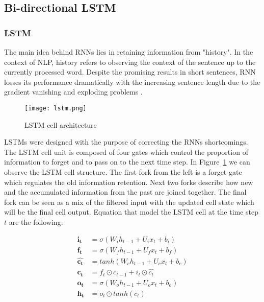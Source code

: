 \subsection{Bi-directional LSTM}

\subsubsection{LSTM}
The main idea behind RNNs lies in retaining information from "history".
In the context of NLP, history refers to observing the context of the
sentence up to the currently processed word. Despite the promising results in short
sentences, RNN losses its performance dramatically with the increasing sentence
length due to the gradient vanishing \cite{bengio1994learning}
and exploding problems \cite{pascanu2013difficulty}.

\begin{figure}
  \caption{LSTM cell architecture \cite{colahblog2015}}
  \label{fig:lstm}
  \centering
    \texttt{[image: lstm.png]}
\end{figure}

LSTMs were designed with the purpose of correcting the RNNs shortcomings. The LSTM
cell unit is composed of four gates which control the proportion of
information to forget and to pass on to the next time step. In Figure~\ref{fig:lstm}
we can observe the LSTM cell structure. The first fork from the left
is a forget gate which regulates the old information retention. Next two forks 
describe how new and the accumulated information from the past are joined
together. The final fork can be seen as a mix of the filtered input with the
updated cell state which will be the final cell output. Equation that model the
LSTM cell at the time step $t$ are the following:

\begin{align*}
        \bm{i_t} &= \sigma\left(W_ih_{t-1} + U_{i}x_t + b_i\right)\\
        \bm{f_t} &= \sigma\left(W_fh_{t-1} + U_{f}x_t + b_f\right)\\
        \bm{\hat{c_t}} &= tanh\left(W_ch_{t-1} + U_{c}x_t + b_c\right)\\
        \bm{c_t} &=  f_t \odot c_{t-1} + i_t \odot \hat{c_t}\\
        \bm{o_t} &= \sigma\left(W_oh_{t-1} + U_{o}x_t + b_o\right)\\
        \bm{h_t} &= o_t \odot tanh(c_t)
\end{align*}


